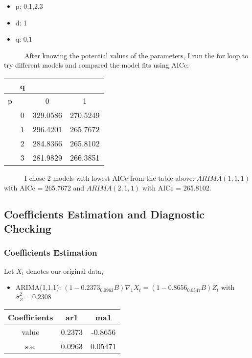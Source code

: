 \documentclass[
]{article}
\providecommand{\tightlist}{%
  \setlength{\itemsep}{0pt}\setlength{\parskip}{0pt}}
\begin{document}
\begin{itemize}
\tightlist
\item
  p: 0,1,2,3
\item
  d: 1
\item
  q: 0,1
\end{itemize}

~~~~~~After knowing the potential values of the parameters, I run the
for loop to try different models and compared the model fits using AICc:

\begin{longtable}[]{@{}cccc@{}}
\toprule\noalign{}
& q & & \\
\midrule\noalign{}
\endhead
\bottomrule\noalign{}
\endlastfoot
p & & 0 & 1 \\
& 0 & 329.0586 & 270.5249 \\
& 1 & 296.4201 & 265.7672 \\
& 2 & 284.8366 & 265.8102 \\
& 3 & 281.9829 & 266.3851 \\
\end{longtable}

~~~~~~I chose 2 models with lowest AICc from the table above:
\(ARIMA(1,1,1)\) with AICc = 265.7672 and \(ARIMA(2,1,1)\) with AICc =
265.8102.

\hfill\break

\hypertarget{coefficients-estimation-and-diagnostic-checking}{%
\subsection{Coefficients Estimation and Diagnostic
Checking}\label{coefficients-estimation-and-diagnostic-checking}}

\hypertarget{coefficients-estimation}{%
\subsubsection{Coefficients Estimation}\label{coefficients-estimation}}

Let \textbf{\(X_t\)} denotes our original data,

\begin{itemize}
\tightlist
\item
  ARIMA(1,1,1):
  \((1-0.2373_{0.0963}B)\nabla_1X_t = (1-0.8656_{0.0547}B)Z_t\) with
  \(\hat{\sigma}^2_Z = 0.2308\)
\end{itemize}

\begin{longtable}[]{@{}ccc@{}}
\toprule\noalign{}
Coefficients & ar1 & ma1 \\
\midrule\noalign{}
\endhead
\bottomrule\noalign{}
\endlastfoot
value & 0.2373 & -0.8656 \\
s.e. & 0.0963 & 0.05471 \\
\end{longtable}
\end{document}
